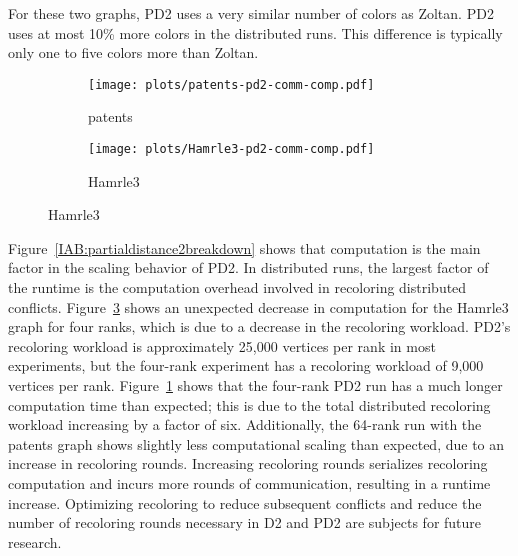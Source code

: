 For these two graphs, PD2 uses a very similar number of colors as Zoltan. 
PD2 uses at most 10\% more colors in the distributed runs.
This difference is typically only one to five colors more than Zoltan.

\begin{figure}[h]
  \centering
  \caption{PD2 communication time (comm) and computation time (comp) from 1 to 128 GPUs}
  \label{IAB:partialdistance2breakdown}
  \begin{subfigure}[b]{0.25\textwidth}
    \centering
    \texttt{[image: plots/patents-pd2-comm-comp.pdf]}
    \caption{patents}
    \label{IAB:patentsbreakdown}
  \end{subfigure}%
  \begin{subfigure}[b]{0.22\textwidth}
    \centering
    \texttt{[image: plots/Hamrle3-pd2-comm-comp.pdf]}
    \caption{Hamrle3}
    \label{IAB:hamrle3breakdown}
  \end{subfigure}
\end{figure}

Figure~\ref{IAB:partialdistance2breakdown} shows that computation is the main factor in the scaling behavior of PD2.
In distributed runs, the largest factor of the runtime is the computation overhead involved in recoloring distributed conflicts.
Figure~\ref{IAB:hamrle3breakdown} shows an unexpected decrease in computation for the Hamrle3 graph for four ranks, 
which is due to a decrease in the recoloring workload. 
PD2's recoloring workload is approximately 25,000 vertices per rank in most experiments, but the four-rank experiment has a recoloring workload of 9,000 vertices per rank.
Figure~\ref{IAB:patentsbreakdown} shows that the four-rank PD2 run has a much longer computation time than expected; this is due to the total distributed recoloring workload increasing by a factor of six.
Additionally, the 64-rank run with the patents graph shows slightly less computational scaling than expected, due to an increase in recoloring rounds.
Increasing recoloring rounds serializes recoloring computation and incurs more rounds of communication, resulting in a runtime increase.
Optimizing recoloring to reduce subsequent conflicts and reduce the number of recoloring rounds necessary in D2 and PD2 are subjects for future research.



